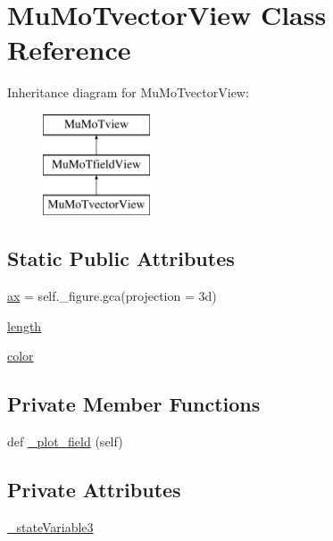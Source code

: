 \hypertarget{class_mu_mo_t_1_1_mu_mo_tvector_view}{}\section{Mu\+Mo\+Tvector\+View Class Reference}
\label{class_mu_mo_t_1_1_mu_mo_tvector_view}
Inheritance diagram for Mu\+Mo\+Tvector\+View\+:\begin{figure}[H]
\begin{center}
\leavevmode
\includegraphics[height=3.000000cm]{class_mu_mo_t_1_1_mu_mo_tvector_view}
\end{center}
\end{figure}
\subsection*{Static Public Attributes}
\begin{DoxyCompactItemize}
\item 
\hyperlink{class_mu_mo_t_1_1_mu_mo_tvector_view_a8fa675eb2fcec5b95d9d21c670da7f30}{ax} = self.\+\_\+figure.\+gca(projection = \textquotesingle{}3d\textquotesingle{})
\item 
\hyperlink{class_mu_mo_t_1_1_mu_mo_tvector_view_af9d495c1655d813d553030485d00fea7}{length}
\item 
\hyperlink{class_mu_mo_t_1_1_mu_mo_tvector_view_a37dbdc30935031c05304482e1be89d8f}{color}
\end{DoxyCompactItemize}
\subsection*{Private Member Functions}
\begin{DoxyCompactItemize}
\item 
def \hyperlink{class_mu_mo_t_1_1_mu_mo_tvector_view_a50d59419298116f738a98c864afb9d89}{\+\_\+plot\+\_\+field} (self)
\end{DoxyCompactItemize}
\subsection*{Private Attributes}
\begin{DoxyCompactItemize}
\item 
\hyperlink{class_mu_mo_t_1_1_mu_mo_tvector_view_ad2f8dc44173a16468bd9d3ab335f9b27}{\+\_\+state\+Variable3}
\end{DoxyCompactItemize}
